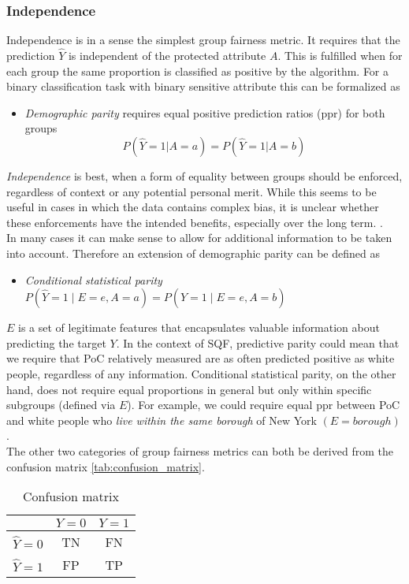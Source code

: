 \subsubsection*{Independence}
Independence is in a sense the simplest group fairness metric. It requires that the prediction $\hat{Y}$ is independent of the protected attribute $A$. This is fulfilled when for each group the same proportion is classified as positive by the algorithm. For a binary classification task with binary sensitive attribute this can be formalized as
\begin{itemize}
    \item \textit{Demographic parity} requires equal positive prediction ratios (ppr) for both groups $$P(\hat{Y} = 1 | A = a) = P(\hat{Y} = 1 | A = b)$$
\end{itemize}
\textit{Independence} is best, when a form of equality between groups should be enforced, regardless of context or any potential personal merit. While this seems to be useful in cases in which the data contains complex bias, it is unclear whether these enforcements have the intended benefits, especially over the long term. {\color{red}{Reference?}}.\\
In many cases it can make sense to allow for additional information to be taken into account. Therefore an extension of demographic parity can be defined as
\begin{itemize}
    \item \textit{Conditional statistical parity} $P(\hat{Y} = 1 \mid E = e, A = a) = P(\hat{Y} = 1 \mid E = e, A = b)$
\end{itemize}
$E$ is a set of legitimate features that encapsulates valuable information about predicting the target $Y$.
In the context of SQF, predictive parity could mean that we require that PoC relatively measured are as often predicted positive as white people, regardless of any information.  Conditional statistical parity, on the other hand, does not require equal proportions in general but only within specific subgroups (defined via $E$). For example, we could require equal ppr between PoC and white people who \textit{live within the same borough} of New York $(E = borough)$.\\
The other two categories of group fairness metrics can both be derived from the confusion matrix \autoref{tab:confusion_matrix}.

\begin{table}
    \centering
    \begin{tabular}{|c|c|c|}
        \hline
        & \(Y = 0\) & \(Y = 1\) \\
        \hline
        \(\hat{Y} = 0\) & TN & FN \\
        \hline
        \(\hat{Y} = 1\) & FP & TP \\
        \hline
    \end{tabular}
    \caption{Confusion matrix}
    \label{tab:confusion_matrix}
\end{table}

